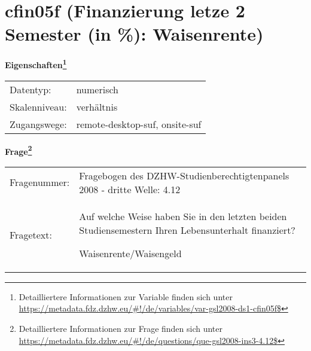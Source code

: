 
    \setcounter{footnote}{0}

    \vspace*{-1.8cm}
	\section{cfin05f (Finanzierung letze 2 Semester (in \%): Waisenrente)}
	\label{section:cfin05f}



    \vspace*{0.5cm}
    \noindent\textbf{Eigenschaften\footnote{Detailliertere Informationen zur Variable finden sich unter
		\url{https://metadata.fdz.dzhw.eu/\#!/de/variables/var-gsl2008-ds1-cfin05f$}}}\\
	\begin{tabularx}{\hsize}{@{}lX}
	Datentyp: & numerisch \\
	Skalenniveau: & verhältnis \\
	Zugangswege: &
	  remote-desktop-suf, 
	  onsite-suf
 \\
    \end{tabularx}



				\vspace*{0.5cm}
                \noindent\textbf{Frage\footnote{Detailliertere Informationen zur Frage finden sich unter
		              \url{https://metadata.fdz.dzhw.eu/\#!/de/questions/que-gsl2008-ins3-4.12$}}}\\
				\begin{tabularx}{\hsize}{@{}lX}
					Fragenummer: &
					  Fragebogen des DZHW-Studienberechtigtenpanels 2008 - dritte Welle:
					  4.12
 \\
					Fragetext: & Auf welche Weise haben Sie in den letzten beiden Studiensemestern Ihren Lebensunterhalt finanziert?\par  Waisenrente/Waisengeld \\
				\end{tabularx}





